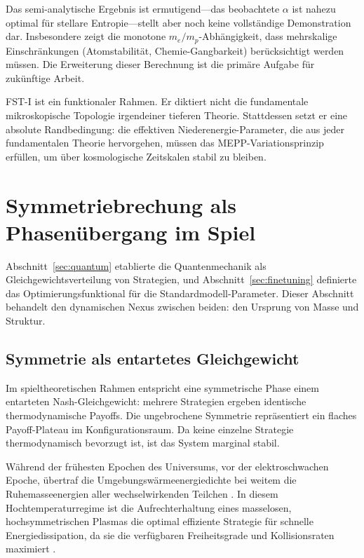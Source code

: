 \documentclass[12pt,a4paper]{article}
\theoremstyle{remark}
\begin{document}
Das semi-analytische Ergebnis ist ermutigend---das beobachtete $\alpha$ ist nahezu optimal f\"ur stellare Entropie---stellt aber noch keine vollst\"andige Demonstration dar. Insbesondere zeigt die monotone $m_e/m_p$-Abh\"angigkeit, dass mehrskalige Einschr\"ankungen (Atomstabilit\"at, Chemie-Gangbarkeit) ber\"ucksichtigt werden m\"ussen. Die Erweiterung dieser Berechnung ist die prim\"are Aufgabe f\"ur zuk\"unftige Arbeit.

FST-I ist ein funktionaler Rahmen. Er diktiert nicht die fundamentale mikroskopische Topologie irgendeiner tieferen Theorie. Stattdessen setzt er eine absolute Randbedingung: die effektiven Niederenergie-Parameter, die aus jeder fundamentalen Theorie hervorgehen, m\"ussen das MEPP-Variationsprinzip erf\"ullen, um \"uber kosmologische Zeitskalen stabil zu bleiben.

\section{Symmetriebrechung als Phasen\"ubergang im Spiel}
\label{sec:symmetry}

Abschnitt~\ref{sec:quantum} etablierte die Quantenmechanik als Gleichgewichtsverteilung von Strategien, und Abschnitt~\ref{sec:finetuning} definierte das Optimierungsfunktional f\"ur die Standardmodell-Parameter. Dieser Abschnitt behandelt den dynamischen Nexus zwischen beiden: den Ursprung von Masse und Struktur.

\subsection{Symmetrie als entartetes Gleichgewicht}

Im spieltheoretischen Rahmen entspricht eine symmetrische Phase einem entarteten Nash-Gleichgewicht: mehrere Strategien ergeben identische thermodynamische Payoffs. Die ungebrochene Symmetrie repr\"asentiert ein flaches Payoff-Plateau im Konfigurationsraum. Da keine einzelne Strategie thermodynamisch bevorzugt ist, ist das System marginal stabil.

W\"ahrend der fr\"uhesten Epochen des Universums, vor der elektroschwachen Epoche, \"ubertraf die Umgebungsw\"armeenergiedichte bei weitem die Ruhemasseenergien aller wechselwirkenden Teilchen \citep{HiggsVEV}. In diesem Hochtemperaturregime ist die Aufrechterhaltung eines masselosen, hochsymmetrischen Plasmas die optimal effiziente Strategie f\"ur schnelle Energiedissipation, da sie die verf\"ugbaren Freiheitsgrade und Kollisionsraten maximiert \citep{HiggsVEV2024}.
\end{document}
